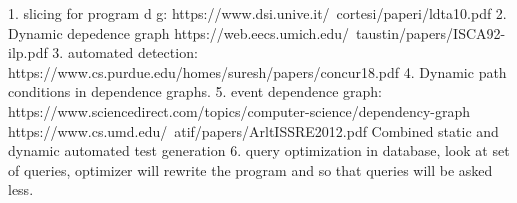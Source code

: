 1. slicing for program d g:
https://www.dsi.unive.it/~cortesi/paperi/ldta10.pdf
2. Dynamic depedence graph https://web.eecs.umich.edu/~taustin/papers/ISCA92-ilp.pdf
3. automated detection:
https://www.cs.purdue.edu/homes/suresh/papers/concur18.pdf
4. Dynamic path conditions in dependence graphs.
5. event dependence graph:
https://www.sciencedirect.com/topics/computer-science/dependency-graph
https://www.cs.umd.edu/~atif/papers/ArltISSRE2012.pdf
Combined static and dynamic automated test generation
6. query optimization in database, look at set of queries, optimizer will rewrite the program and so that queries will be asked less. 
